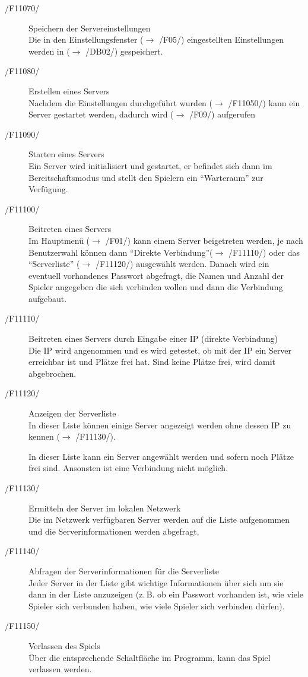 \documentclass[a4paper,10pt]{article}
\begin{document}
\begin{description}
\item[/F11070/] Speichern der Servereinstellungen \\
Die in den Einstellungsfenster ($\rightarrow$ /F05/) eingestellten Einstellungen werden in ($\rightarrow$ /DB02/) gespeichert.

\item[/F11080/] Erstellen eines Servers \\
Nachdem die Einstellungen durchgeführt wurden ($\rightarrow$ /F11050/) kann ein Server gestartet werden, dadurch wird ($\rightarrow$ /F09/) aufgerufen

\item[/F11090/] Starten eines Servers \\
Ein Server wird initialisiert und gestartet, er befindet sich dann im Bereitschaftsmodus und stellt den Spielern ein "`Warteraum"' zur Verfügung.

\item[/F11100/] Beitreten eines Servers \\
Im Hauptmenü ($\rightarrow$ /F01/) kann einem Server beigetreten werden, je nach Benutzerwahl können dann "`Direkte Verbindung"'($\rightarrow$ /F11110/) oder das "`Serverliste"' ($\rightarrow$ /F11120/) ausgewählt werden. Danach wird ein eventuell vorhandenes Passwort abgefragt, die Namen und Anzahl der Spieler angegeben die sich verbinden wollen und dann die Verbindung aufgebaut.

\item[/F11110/] Beitreten eines Servers durch Eingabe einer IP (direkte Verbindung) \\
Die IP wird angenommen und es wird getestet, ob mit der IP ein Server erreichbar ist und Plätze frei hat. Sind keine Plätze frei, wird damit abgebrochen.

\item[/F11120/] Anzeigen der Serverliste \\
In dieser Liste können einige Server angezeigt werden ohne dessen IP zu kennen ($\rightarrow$ /F11130/).

In dieser Liste kann ein Server angewählt werden und sofern noch Plätze frei sind. Ansonsten ist eine Verbindung nicht möglich.
\item[/F11130/] Ermitteln der Server im lokalen Netzwerk \\
Die im Netzwerk verfügbaren Server werden auf die Liste aufgenommen und die Serverinformationen werden abgefragt.
\item[/F11140/] Abfragen der Serverinformationen für die Serverliste \\
Jeder Server in der Liste gibt wichtige Informationen über sich um sie dann in der Liste anzuzeigen (z.\,B. ob ein Passwort vorhanden ist, wie viele Spieler sich verbunden haben, wie viele Spieler sich verbinden dürfen).
\item[/F11150/] Verlassen des Spiels \\
Über die entsprechende Schaltfläche im Programm, kann das Spiel verlassen werden.
\end{description}
\end{document}
